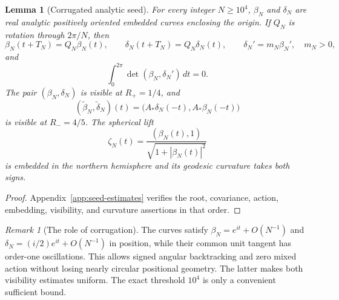\documentclass[11pt]{amsart}
\newtheorem{lemma}[theorem]{Lemma}
\theoremstyle{definition}
\theoremstyle{remark}
\newtheorem{remark}[theorem]{Remark}
\numberwithin{equation}{section}
\begin{document}
\begin{lemma}[Corrugated analytic seed]\label{lem:seed}
For every integer $N\ge10^4$, $\beta_N$ and $\delta_N$ are real analytic
positively oriented embedded curves enclosing the origin. If $Q_N$ is
rotation through $2\pi/N$, then
\begin{equation}\label{eq:seed-data}
 \beta_N(t+T_N)=Q_N\beta_N(t),\qquad
 \delta_N(t+T_N)=Q_N\delta_N(t),\qquad
 \delta_N'=m_N\beta_N',\quad m_N>0,
\end{equation}
and
\begin{equation}\label{eq:zero-action}
 \int_0^{2\pi}\det(\beta_N,\delta_N')\,dt=0.
\end{equation}
The pair $(\beta_N,\delta_N)$ is visible at $R_+=1/4$, and
\[
 (\widetilde\beta_N,\widetilde\delta_N)(t)
 =\bigl(A_*\delta_N(-t),A_*\beta_N(-t)\bigr)
\]
is visible at $R_-=4/5$. The spherical lift
\[
 \zeta_N(t)=\frac{(\beta_N(t),1)}{\sqrt{1+|\beta_N(t)|^2}}
\]
is embedded in the northern hemisphere and its geodesic curvature takes
both signs.
\end{lemma}
\begin{proof}
Appendix~\ref{app:seed-estimates} verifies the root, covariance, action,
embedding, visibility, and curvature assertions in that order.
\end{proof}

\begin{remark}[The role of corrugation]\label{rem:corrugation-mechanism}
The curves satisfy $\beta_N=e^{it}+O(N^{-1})$ and
$\delta_N=(i/2)e^{it}+O(N^{-1})$ in position, while their common unit
tangent has order-one oscillations. This allows signed angular backtracking
and zero mixed action without losing nearly circular positional geometry.
The latter makes both visibility estimates uniform. The exact threshold
$10^4$ is only a convenient sufficient bound.
\end{remark}
\end{document}
